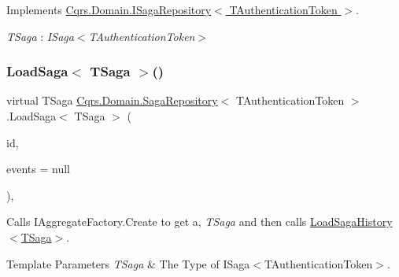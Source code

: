 Implements \hyperlink{interfaceCqrs_1_1Domain_1_1ISagaRepository_aa3409bf59bbe489afcc89716928e9ad1_aa3409bf59bbe489afcc89716928e9ad1}{Cqrs.\+Domain.\+I\+Saga\+Repository$<$ T\+Authentication\+Token $>$}.

\begin{Desc}
\item[Type Constraints]\begin{description}
\item[{\em T\+Saga} : {\em I\+Saga$<$T\+Authentication\+Token$>$}]\end{description}
\end{Desc}
\mbox{\label{classCqrs_1_1Domain_1_1SagaRepository_acc59a4478bb992b03690f0cda3e4e362_acc59a4478bb992b03690f0cda3e4e362}} 
\subsubsection{\texorpdfstring{Load\+Saga$<$ T\+Saga $>$()}{LoadSaga< TSaga >()}}
{\footnotesize\ttfamily virtual T\+Saga \hyperlink{classCqrs_1_1Domain_1_1SagaRepository}{Cqrs.\+Domain.\+Saga\+Repository}$<$ T\+Authentication\+Token $>$.Load\+Saga$<$ T\+Saga $>$ (\begin{DoxyParamCaption}\item[{Guid}]{id,  }\item[{I\+List$<$ \hyperlink{interfaceCqrs_1_1Events_1_1ISagaEvent}{I\+Saga\+Event}$<$ T\+Authentication\+Token $>$$>$}]{events = {\ttfamily null} }\end{DoxyParamCaption})\hspace{0.3cm}{\ttfamily [protected]}, {\ttfamily [virtual]}}



Calls I\+Aggregate\+Factory.\+Create to get a, {\itshape T\+Saga}  and then calls \hyperlink{classCqrs_1_1Domain_1_1SagaRepository_af6af9066681e47bc4ff2e14358321fb8_af6af9066681e47bc4ff2e14358321fb8}{Load\+Saga\+History$<$\+T\+Saga$>$}. 


\begin{DoxyTemplParams}{Template Parameters}
{\em T\+Saga} & The Type of I\+Saga$<$\+T\+Authentication\+Token$>$.\\
\hline
\end{DoxyTemplParams}

